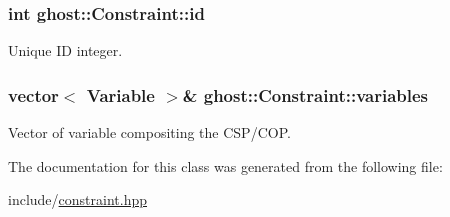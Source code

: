 \subsubsection[{\texorpdfstring{id}{id}}]{\setlength{\rightskip}{0pt plus 5cm}int ghost\+::\+Constraint\+::id\hspace{0.3cm}{\ttfamily [protected]}}\hypertarget{classghost_1_1Constraint_a5215df3cd5269adb4c5f6168191b9d47}{}\label{classghost_1_1Constraint_a5215df3cd5269adb4c5f6168191b9d47}


Unique ID integer. 

\subsubsection[{\texorpdfstring{variables}{variables}}]{\setlength{\rightskip}{0pt plus 5cm}vector$<$ {\bf Variable} $>$\& ghost\+::\+Constraint\+::variables\hspace{0.3cm}{\ttfamily [protected]}}\hypertarget{classghost_1_1Constraint_aff0c784579a9d69524be3dc9c0068302}{}\label{classghost_1_1Constraint_aff0c784579a9d69524be3dc9c0068302}


Vector of variable compositing the C\+S\+P/\+C\+OP. 



The documentation for this class was generated from the following file\+:\begin{DoxyCompactItemize}
\item 
include/\hyperlink{constraint_8hpp}{constraint.\+hpp}\end{DoxyCompactItemize}
